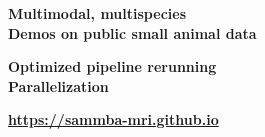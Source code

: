 \documentclass[a0paper,portrait]{baposter}
\begin{document}
\begin{poster}
{\begin{minipage}[t]{0.5\textwidth}
\textbf{Multimodal, multispecies}\\
\textbf{Demos on public small animal data}
\end{minipage}
\begin{minipage}[t]{0.5\textwidth}
\textbf{Optimized pipeline rerunning}\\
\textbf{Parallelization}
\end{minipage}


\begin{center}
\textbf{\Large{\textcolor{emphsizecol}{\textbf{\url{https://sammba-mri.github.io}}}}}
\end{center}
}


\end{poster}
\end{document}
